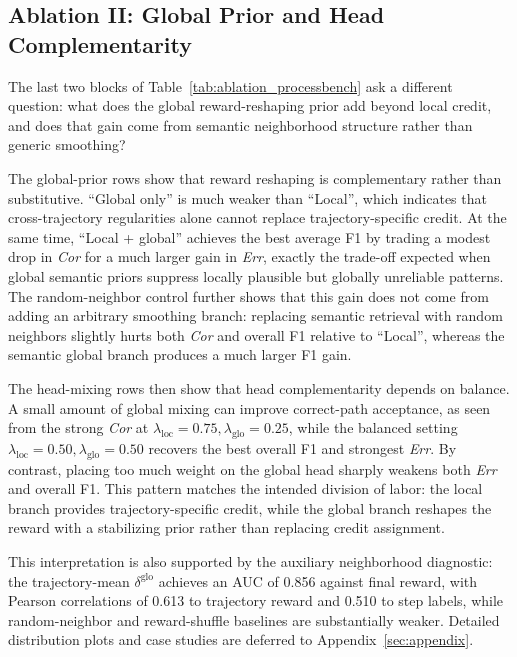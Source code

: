\FloatBarrier

\subsection{Ablation II: Global Prior and Head Complementarity}
The last two blocks of Table~\ref{tab:ablation_processbench} ask a different
question: what does the global reward-reshaping prior add beyond local credit,
and does that gain come from semantic neighborhood structure rather than
generic smoothing?

The global-prior rows show that reward reshaping is complementary rather than
substitutive.
``Global only'' is much weaker than ``Local'', which indicates that
cross-trajectory regularities alone cannot replace trajectory-specific credit.
At the same time, ``Local + global'' achieves the best average F1 by trading a
modest drop in \textit{Cor} for a much larger gain in \textit{Err}, exactly
the trade-off expected when global semantic priors suppress locally plausible
but globally unreliable patterns.
The random-neighbor control further shows that this gain does not come from
adding an arbitrary smoothing branch: replacing semantic retrieval with random
neighbors slightly hurts both \textit{Cor} and overall F1 relative to
``Local'', whereas the semantic global branch produces a much larger F1 gain.

The head-mixing rows then show that head complementarity depends on balance.
A small amount of global mixing can improve correct-path acceptance, as seen
from the strong \textit{Cor} at
\(\lambda_{\mathrm{loc}}=0.75,\lambda_{\mathrm{glo}}=0.25\), while the balanced
setting
\(\lambda_{\mathrm{loc}}=0.50,\lambda_{\mathrm{glo}}=0.50\) recovers the best
overall F1 and strongest \textit{Err}.
By contrast, placing too much weight on the global head sharply weakens both
\textit{Err} and overall F1.
This pattern matches the intended division of labor: the local branch provides
trajectory-specific credit, while the global branch reshapes the reward with a
stabilizing prior rather than replacing credit assignment.

This interpretation is also supported by the auxiliary neighborhood diagnostic:
the trajectory-mean \(\delta^{\mathrm{glo}}\) achieves an AUC of 0.856 against
final reward, with Pearson correlations of 0.613 to trajectory reward and
0.510 to step labels, while random-neighbor and reward-shuffle baselines are
substantially weaker.
Detailed distribution plots and case studies are deferred to
Appendix~\ref{sec:appendix}.